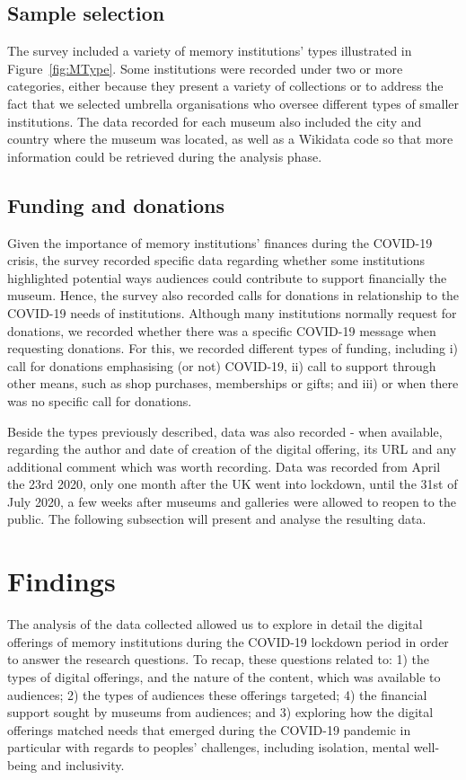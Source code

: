 \documentclass{egpubl}
\begin{document}
\subsection{Sample selection}
The survey included a variety of memory institutions’ types illustrated in Figure~\ref{fig:MType}. Some institutions were recorded under two or more categories, either because they present a variety of collections or to address the fact that we selected umbrella organisations who oversee different types of smaller institutions. The data recorded for each museum also included the city and country where the museum was located, as well as a Wikidata code so that more information could be retrieved during the analysis phase.

\subsection{Funding and donations}
Given the importance of memory institutions’ finances during the COVID-19 crisis, the survey recorded specific data regarding whether some institutions highlighted potential ways audiences could contribute to support financially the museum. Hence, the survey also recorded calls for donations in relationship to the COVID-19 needs of institutions. Although many institutions normally request for donations, we recorded whether there was a specific COVID-19 message when requesting donations. For this, we recorded different types of funding, including i) call for donations emphasising (or not)  COVID-19, ii) call to support through other means, such as shop purchases, memberships or gifts; and iii) or when there was no specific call for donations.

Beside the types previously described, data was also recorded - when available, regarding the author and date of creation of the digital offering, its URL and any additional comment which was worth recording. Data was recorded from April the 23rd 2020, only one month after the UK went into lockdown, until the 31st of July 2020, a few weeks after museums and galleries were allowed to reopen to the public. The following subsection will present and analyse the resulting data. 


\section{Findings}
The analysis of the data collected allowed us to explore in detail the digital offerings of memory institutions during the COVID-19 lockdown period in order to answer the research questions. To recap, these questions related to: 1) the types of digital offerings, and the nature of the content, which was available to audiences; 2) the types of audiences these offerings targeted; 4) the financial support sought by museums from audiences; and 3) exploring how the digital offerings matched needs that emerged during the COVID-19 pandemic in particular with regards to peoples’ challenges, including isolation, mental well-being and inclusivity. 
\end{document}
